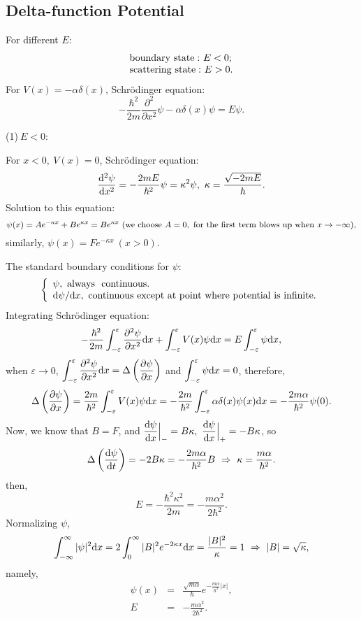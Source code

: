 \documentclass[12pt, 
]{article}
\begin{document}
\subsection{Delta-function Potential}
For different $E$:
\[
	\begin{array}{l}
		{\rm boundary~ state:}~E<0;\\
		{\rm scattering~ state:}~E>0.
	\end{array}
\]
For $V(x)=-\alpha \delta(x)$, Schr\"odinger equation:
\[
	-\frac{\hbar^2}{2m}\frac{\partial^2}{\partial x^2}\psi-\alpha\delta(x)\psi=E\psi.
\]

\noindent (1)$~E<0$:

\noindent For $x<0,~V(x)=0$, Schr\"odinger equation:
\[
	\frac{{\rm d}^2 \psi}{{\rm d}x^2}=-\frac{2mE}{\hbar^2}\psi=\kappa^2\psi,~\kappa=\frac{\sqrt{-2mE}}{\hbar}.
\]
Solution to this equation:
\[
	\psi(x)=Ae^{-\kappa x}+Be^{\kappa x}=Be^{\kappa x}~({\rm we~choose} ~A=0,~{\rm for~the~first~term~blows~up~when}~x\rightarrow -\infty),
\]
similarly, $\psi(x)=Fe^{-\kappa x}~(x>0)$.

\noindent The standard boundary conditions for $\psi$:
\[
	\left\{
	\begin{array}{l}
		\psi,~{\rm always~~continuous.}\\
		{\rm d}\psi/{\rm d}x,~{\rm continuous~except~at~point~where~potential~is~infinite.}
	\end{array}
	\right.
\]
Integrating Schr\"odinger equation:
\[
	-\frac{\hbar^2}{2m}\int_{-\varepsilon}^{\varepsilon}\frac{\partial^2\psi}{\partial x^2}{\rm d}x+\int_{-\varepsilon}^{\varepsilon}V(x)\psi{\rm d}x=E\int_{-\varepsilon}^{\varepsilon}\psi{\rm d}x,
\]
when $\varepsilon\rightarrow0$, $\displaystyle\int_{-\varepsilon}^\varepsilon\frac{\partial^2\psi}{\partial x^2}{\rm d}x=\Delta\left(\frac{\partial\psi}{\partial x}\right)$ and $\displaystyle\int_{-\varepsilon}^\varepsilon\psi{\rm d}x=0$,
therefore,
\[
	\Delta\left(\frac{\partial\psi}{\partial x}\right)=\frac{2m}{\hbar^2}\int_{-\varepsilon}^\varepsilon V(x)\psi{\rm d}x=-\frac{2m}{\hbar^2}\int_{-\varepsilon}^\varepsilon\alpha\delta(x)\psi(x){\rm d}x=-\frac{2m\alpha}{\hbar^2}\psi(0).
\]
Now, we know that $B=F$, and $\dfrac{{\rm d}\psi}{{\rm d}x}\Big|_{-}=B\kappa,~\dfrac{{\rm d}\psi}{{\rm d}x}\Big|_+=-B\kappa$, so
\[
	\Delta\left(\frac{{\rm d}\psi}{{\rm d}t}\right)=-2B\kappa=-\frac{2m\alpha}{\hbar^2}B~\Rightarrow~\kappa=\frac{m\alpha}{\hbar^2}.
\]
then,
\[
	E=-\frac{\hbar^2\kappa^2}{2m}=-\frac{m\alpha^2}{2\hbar^2}.
\]
Normalizing $\psi$,
\[
	\int_{-\infty}^\infty|\psi|^2{\rm d}x=2\int_0^\infty|B|^2e^{-2\kappa x}{\rm d}x=\frac{{|B|^2}}{\kappa}=1~\Rightarrow~|B|=\sqrt{\kappa},
\]namely,
\begin{eqnarray*}
	\psi(x)&=&\frac{\sqrt{m\alpha}}{\hbar}e^{-\frac{m\alpha}{\hbar^2}|x|},\\
	E&=&-\frac{m\alpha^2}{2\hbar^2}.
\end{eqnarray*}
~\\
\end{document}

